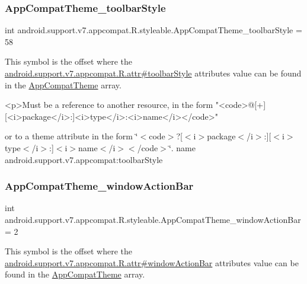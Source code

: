 \subsubsection{\texorpdfstring{App\+Compat\+Theme\+\_\+toolbar\+Style}{AppCompatTheme\_toolbarStyle}}
{\footnotesize\ttfamily int android.\+support.\+v7.\+appcompat.\+R.\+styleable.\+App\+Compat\+Theme\+\_\+toolbar\+Style = 58\hspace{0.3cm}{\ttfamily [static]}}

This symbol is the offset where the \hyperlink{classandroid_1_1support_1_1v7_1_1appcompat_1_1R_1_1attr_af5896838850b900b5fc76c6bbda40f7f}{android.\+support.\+v7.\+appcompat.\+R.\+attr\#toolbar\+Style} attribute\textquotesingle{}s value can be found in the \hyperlink{classandroid_1_1support_1_1v7_1_1appcompat_1_1R_1_1styleable_a5c42f89e8a410c323be34208d75c430b}{App\+Compat\+Theme} array.

\begin{DoxyVerb}      <p>Must be a reference to another resource, in the form "<code>@[+][<i>package</i>:]<i>type</i>:<i>name</i></code>"
\end{DoxyVerb}
 or to a theme attribute in the form \char`\"{}$<$code$>$?\mbox{[}$<$i$>$package$<$/i$>$\+:\mbox{]}\mbox{[}$<$i$>$type$<$/i$>$\+:\mbox{]}$<$i$>$name$<$/i$>$$<$/code$>$\char`\"{}.  name android.\+support.\+v7.\+appcompat\+:toolbar\+Style \mbox{\label{classandroid_1_1support_1_1v7_1_1appcompat_1_1R_1_1styleable_a9ed69fb61097add24dccaf9f82bbd746}} 
\subsubsection{\texorpdfstring{App\+Compat\+Theme\+\_\+window\+Action\+Bar}{AppCompatTheme\_windowActionBar}}
{\footnotesize\ttfamily int android.\+support.\+v7.\+appcompat.\+R.\+styleable.\+App\+Compat\+Theme\+\_\+window\+Action\+Bar = 2\hspace{0.3cm}{\ttfamily [static]}}

This symbol is the offset where the \hyperlink{classandroid_1_1support_1_1v7_1_1appcompat_1_1R_1_1attr_ad4cb7154b0f22de4c1ea343bc2999284}{android.\+support.\+v7.\+appcompat.\+R.\+attr\#window\+Action\+Bar} attribute\textquotesingle{}s value can be found in the \hyperlink{classandroid_1_1support_1_1v7_1_1appcompat_1_1R_1_1styleable_a5c42f89e8a410c323be34208d75c430b}{App\+Compat\+Theme} array.

